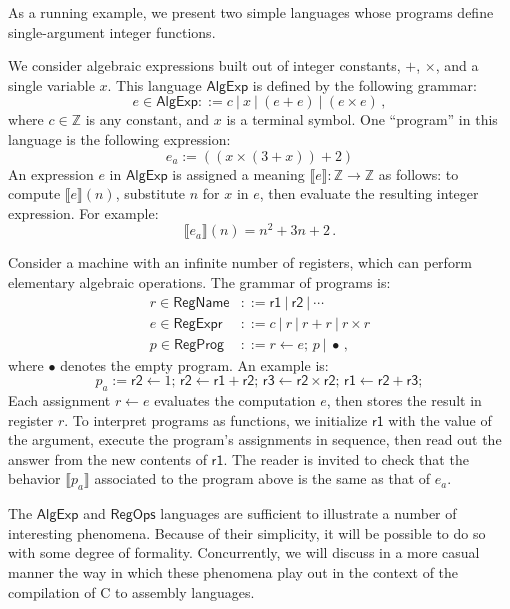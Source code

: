 \documentclass[sigplan,10pt,review,anonymous]{acmart}
\newcommand{\kw}[1]{\ensuremath{ \textsf{#1} }}
\begin{document}
{\color{gray} %

As a running example,
we present two simple languages
whose programs define single-argument integer functions.

\begin{example}[$\kw{AlgExp}$] %
We consider algebraic expressions
built out of integer constants, $+$, $\times$,
and a single variable $x$.
This language $\kw{AlgExp}$ is defined by the following grammar:
\[
  e \in \kw{AlgExp} ::= c \:|\: x \:|\: (e + e) \:|\: (e \times e) \,,
\]
where $c \in \mathbb{Z}$ is any constant,
and $x$ is a terminal symbol.
One ``program'' in this language is the following expression:
\[
  e_a := ((x \times (3 + x)) + 2)
\]
An expression $e$ in \kw{AlgExp} is assigned a meaning
$\llbracket e \rrbracket : \mathbb{Z} \rightarrow \mathbb{Z}$
as follows:
to compute $\llbracket e \rrbracket(n)$,
substitute $n$ for $x$ in $e$,
then evaluate the resulting integer expression.
For example:
\[
  \llbracket e_a \rrbracket (n) = n^2 + 3n + 2 \,.
\]
\end{example}

\begin{example}[$\kw{RegProg}$] %
Consider a machine with an infinite number of registers,
which can perform elementary algebraic operations.
The grammar of programs is:
\begin{align*}
  r \in \kw{RegName} &::= \kw{r1} \:|\: \kw{r2} \:|\: \cdots \\
  e \in \kw{RegExpr} &::= c \:|\: r \:|\: r + r \:|\: r \times r \\
  p \in \kw{RegProg} &::= r \leftarrow e; \, p \:|\: \bullet \,,
\end{align*}
where $\bullet$ denotes the empty program.
An example is:
\[
  p_a :=
  \kw{r2} \leftarrow 1; \,
  \kw{r2} \leftarrow \kw{r1} + \kw{r2}; \,
  \kw{r3} \leftarrow \kw{r2} \times \kw{r2}; \,
  \kw{r1} \leftarrow \kw{r2} + \kw{r3};
\]
Each assignment $r \leftarrow e$ evaluates the computation $e$,
then stores the result in register $r$.
To interpret programs as functions,
we initialize $\kw{r1}$ with the value of the argument,
execute the program's assignments in sequence,
then read out the answer from the new contents of $\kw{r1}$.
The reader is invited to check that
the behavior $\llbracket p_a \rrbracket$ associated to the program above
is the same as that of $e_a$.
\end{example}

The $\kw{AlgExp}$ and $\kw{RegOps}$ languages
are sufficient to illustrate a number of interesting phenomena.
Because of their simplicity,
it will be possible to do so with some degree of formality.
Concurrently,
we will discuss in a more casual manner
the way in which these phenomena play out
in the context of the compilation of C to assembly languages.

} %
\end{document}
